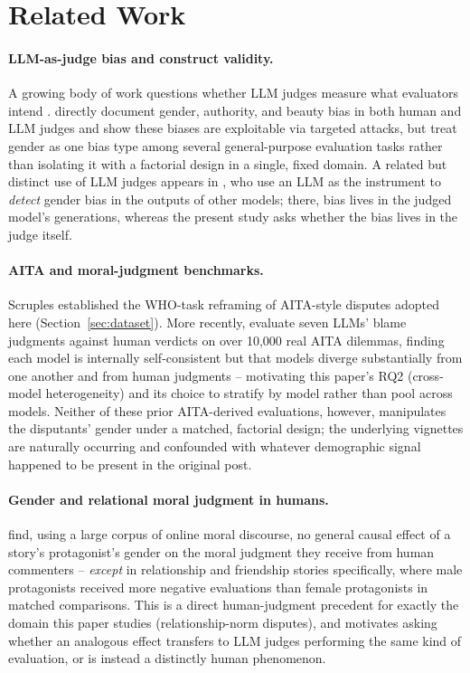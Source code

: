 \section{Related Work}
\label{sec:related}

\paragraph{LLM-as-judge bias and construct validity.} A growing body of
work questions whether LLM judges measure what evaluators intend
\citep{gu2024survey}. \citet{chen2024humans} directly document gender,
authority, and beauty bias in both human and LLM judges and show these
biases are exploitable via targeted attacks, but treat gender as one bias
type among several general-purpose evaluation tasks rather than isolating
it with a factorial design in a single, fixed domain. A related but
distinct use of LLM judges appears in \citet{kumar2024decoding}, who use
an LLM as the instrument to \emph{detect} gender bias in the outputs of
other models; there, bias lives in the judged model's generations, whereas
the present study asks whether the bias lives in the judge itself.

\paragraph{AITA and moral-judgment benchmarks.} Scruples
\citep{lourie2021scruples} established the WHO-task reframing of AITA-style
disputes adopted here (Section~\ref{sec:dataset}). More recently,
\citet{sachdeva2025normative} evaluate seven LLMs' blame judgments
against human verdicts on over 10,000 real AITA dilemmas, finding each
model is internally self-consistent but that models diverge substantially
from one another and from human judgments -- motivating this paper's RQ2
(cross-model heterogeneity) and its choice to stratify by model rather
than pool across models. Neither of these prior AITA-derived evaluations,
however, manipulates the disputants' gender under a matched, factorial
design; the underlying vignettes are naturally occurring and confounded
with whatever demographic signal happened to be present in the original
post.

\paragraph{Gender and relational moral judgment in humans.}
\citet{betti2025moral} find, using a large corpus of online moral
discourse, no general causal effect of a story's protagonist's gender on
the moral judgment they receive from human commenters -- \emph{except} in
relationship and friendship stories specifically, where male protagonists
received more negative evaluations than female protagonists in matched
comparisons. This is a direct human-judgment precedent for exactly the
domain this paper studies (relationship-norm disputes), and motivates
asking whether an analogous effect transfers to LLM judges performing the
same kind of evaluation, or is instead a distinctly human phenomenon.

